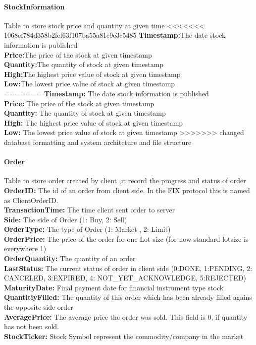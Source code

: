 \documentclass[a4paper, 11pt]{article}
\begin{document}
\paragraph*{StockInformation}
Table to store stock price and quantity at given time
<<<<<<< 1068ef784d358b2fef63f107ba55a81e9e3c5485
\textbf{Timestamp:}The date stock information is published
\\
\textbf{Price:}The price of the stock at given timestamp 
\\
\textbf{Quantity:}The quantity of stock at given timestamp 
\\
\textbf{High:}The highest price value of stock at given timestamp
\\
\textbf{Low:}The lowest price value of stock at given timestamp
\\
=======
\textbf{Timestamp:} The date stock information is published
\\
\textbf{Price:} The price of the stock at given timestamp 
\\
\textbf{Quantity:} The quantity of stock at given timestamp 
\\
\textbf{High:} The highest price value of stock at given timestamp
\\
\textbf{Low:} The lowest price value of stock at given timestamp
>>>>>>> changed database formatting and system architcture and file structure

\paragraph*{Order}
Table to store order created by client ,it record the progress and status of order
 \\
\textbf{OrderID:} The id of an order from client side. In the FIX protocol this is named as ClientOrderID.
 \\
\textbf{TransactionTime:} The time client sent order to server 
 \\
\textbf{Side:} The side of Order (1: Buy, 2: Sell)
 \\
\textbf{OrderType:} The type of Order (1: Market , 2: Limit)
 \\
\textbf{OrderPrice:} The price of the order for one Lot size (for now standard lotsize is everywhere 1)
 \\
\textbf{OrderQuantity:} The quantity of an order
 \\
\textbf{LastStatus:} The current status of order in client side (0:DONE, 1:PENDING, 2: CANCELED, 3:EXPIRED, 4: NOT\_YET\_ACKNOWLEDGE, 5:REJECTED)
 \\
\textbf{MaturityDate:} Final payment date for financial instrument type stock
 \\
\textbf{QuantitiyFilled:} The quantity of this order which has been already filled agains the opposite side order
 \\
\textbf{AveragePrice:} The average price the order was sold. This field is 0, if quantity has  not been sold.
 \\
\textbf{StockTicker:}  Stock Symbol represent the commodity/company in the market
 
\end{document}
